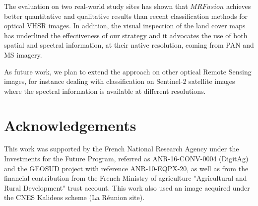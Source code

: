 \documentclass[journal]{IEEEtran}
\newcommand{\method}{$MRFusion$}
\begin{document}
The evaluation on two real-world study sites has shown that \method{} achieves better quantitative and qualitative results than recent classification methods for optical VHSR images. In addition, the visual inspection of the land cover maps has underlined the effectiveness of our strategy and it advocates the use of both spatial and spectral information, at their native resolution, coming from PAN and MS imagery.

As future work, we plan to extend the approach on other optical Remote Sensing images, for instance dealing with classification on Sentinel-2 satellite images where the spectral information is available at different resolutions.


\section{Acknowledgements}
This work was supported by the French National Research Agency under the Investments for the Future Program, referred as ANR-16-CONV-0004 (DigitAg) and the GEOSUD project with reference ANR-10-EQPX-20, as well as from the financial contribution from the French Ministry of agriculture "Agricultural and Rural Development" trust account. This work also used an image acquired under the CNES Kalideos scheme (La R\'{e}union site).



\end{document}
